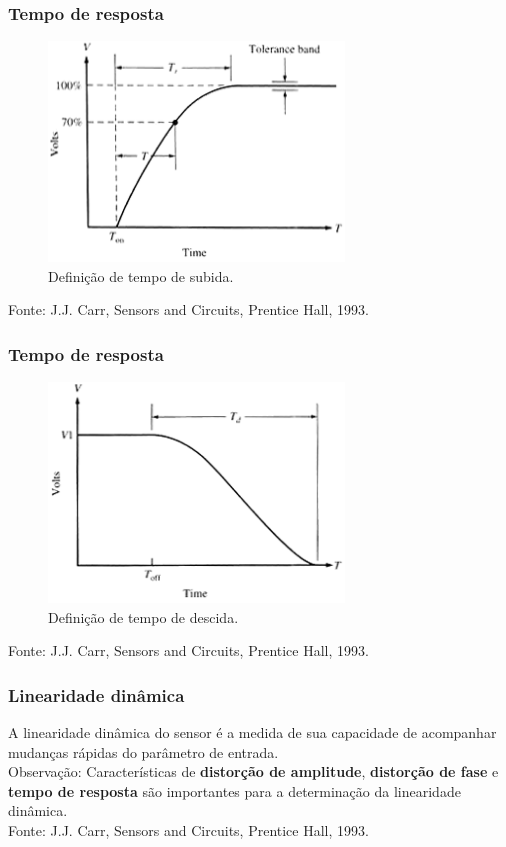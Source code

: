 \documentclass{beamer}
\begin{document}
\begin{frame}
	\frametitle{Tempo de resposta}
	\begin{figure}
		\includegraphics[width=0.7\textwidth]{tempoderespostasubida}
		\caption{Definição de tempo de subida.}
	\end{figure}  	
	{\scriptsize Fonte: J.J. Carr, Sensors and Circuits, Prentice Hall, 1993.}
\end{frame}

\begin{frame}
	\frametitle{Tempo de resposta}
	\begin{figure}
		\includegraphics[width=0.7\textwidth]{tempoderepostadescida}
		\caption{Definição de tempo de descida.}
	\end{figure}  	
	{\scriptsize Fonte: J.J. Carr, Sensors and Circuits, Prentice Hall, 1993.}
\end{frame}

\begin{frame}
	\frametitle{Linearidade dinâmica}
	A linearidade dinâmica do sensor é a medida de sua capacidade de acompanhar mudanças rápidas do parâmetro de entrada.\\
	\bigskip
	Observação:	Características de \textbf{distorção de amplitude}, \textbf{distorção de fase} e \textbf{tempo de resposta} são importantes para a determinação da linearidade dinâmica.\\
	\bigskip
	{\scriptsize Fonte: J.J. Carr, Sensors and Circuits, Prentice Hall, 1993.}
\end{frame}
\end{document}
